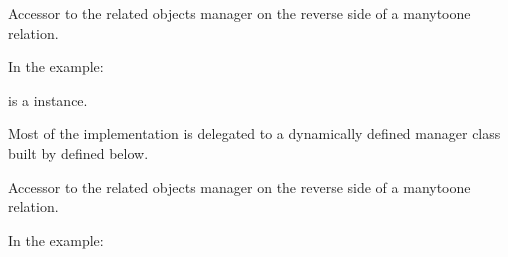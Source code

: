 \documentclass[a4paper,11pt,spanish]{sphinxmanual}
\begin{document}
\begin{fulllineitems}
\begin{fulllineitems}
\label{\detokenize{api/inventory/inventory.models:inventory.models.Location.inventory_main}}
\pysigstartsignatures
\pysigline
{}
\pysigstopsignatures
\sphinxAtStartPar
Accessor to the related objects manager on the reverse side of a
many\sphinxhyphen{}to\sphinxhyphen{}one relation.

\sphinxAtStartPar
In the example:

\begin{sphinxVerbatim}[commandchars=\\\{\}]
       
\end{sphinxVerbatim}

\sphinxAtStartPar
{} is a  instance.

\sphinxAtStartPar
Most of the implementation is delegated to a dynamically defined manager
class built by  defined below.

\end{fulllineitems}


\begin{fulllineitems}
\label{\detokenize{api/inventory/inventory.models:inventory.models.Location.inventory_set}}
\pysigstartsignatures
\pysigline
{}
\pysigstopsignatures
\sphinxAtStartPar
Accessor to the related objects manager on the reverse side of a
many\sphinxhyphen{}to\sphinxhyphen{}one relation.

\sphinxAtStartPar
In the example:

\begin{sphinxVerbatim}[commandchars=\\\{\}]
       
\end{sphinxVerbatim}


\end{fulllineitems}
\end{fulllineitems}
\end{document}
